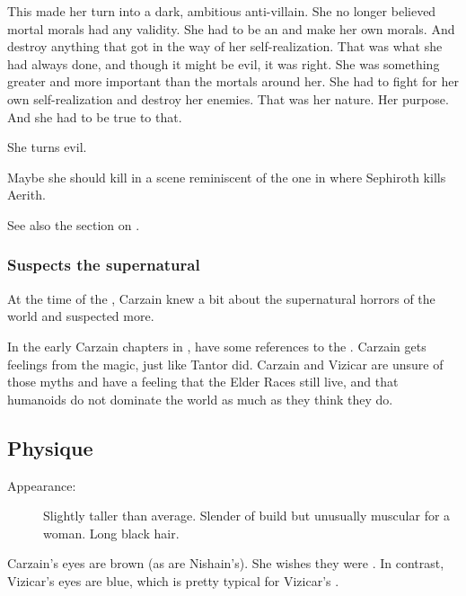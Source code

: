 This made her turn into a dark, ambitious anti-villain. 
She no longer believed mortal morals had any validity. 
She had to be an \Ubermensch and make her own morals. 
And destroy anything that got in the way of her self-realization.
That was what she had always done, and though it might be evil, it was right. 
She was something greater and more important than the mortals around her. 
She had to fight for her own self-realization and destroy her enemies.
That was her nature. 
Her purpose. 
And she had to be true to that. 

She turns evil. 

Maybe she should kill \Racel in a scene reminiscent of the one in \cite{VideoGame:FinalFantasyVII} where Sephiroth kills Aerith. 

See also the section on . 





\subsubsection{Suspects the supernatural}
At the time of the , Carzain knew a bit about the supernatural horrors of the world and suspected more. 

In the early Carzain chapters in \TwilightAngelRememberEmph, have some references to the . 
Carzain gets  feelings from the \EreshKali{} magic, just like Tantor did. 
Carzain and Vizicar are unsure of those myths and have a feeling that the Elder Races still live, and that humanoids do not dominate the world as much as they think they do. 








\subsection{Physique}
\begin{description}
  \item[Appearance:] 
    Slightly taller than average. 
    Slender of build but unusually muscular for a woman.
    Long black hair. 
\end{description}

Carzain's eyes are brown (as are Nishain's). 
She wishes they were . 
In contrast, Vizicar's eyes are blue, which is pretty typical for Vizicar's \vclan. 





